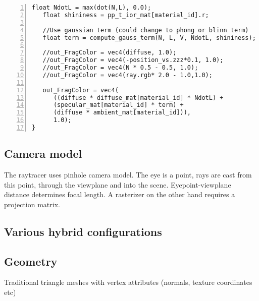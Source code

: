 \begin{Verbatim}[frame=single, numbers=left, label=Final fragment shader]
   float NdotL = max(dot(N,L), 0.0);
   float shininess = pp_t_ior_mat[material_id].r;
	
   //Use gaussian term (could change to phong or blinn term)
   float term = compute_gauss_term(N, L, V, NdotL, shininess);
    
   //out_FragColor = vec4(diffuse, 1.0);
   //out_FragColor = vec4(-position_vs.zzz*0.1, 1.0);
   //out_FragColor = vec4(N * 0.5 - 0.5, 1.0);
   //out_FragColor = vec4(ray.rgb* 2.0 - 1.0,1.0);
    
   out_FragColor = vec4( 
      ((diffuse * diffuse_mat[material_id] * NdotL) + 
      (specular_mat[material_id] * term) + 
      (diffuse * ambient_mat[material_id])), 
      1.0);
}
\end{Verbatim}

\subsection{Camera model}
The raytracer uses pinhole camera model. The eye is a point, rays are cast from this point, through the viewplane and into the scene. Eyepoint-viewplane distance determines focal length. A rasterizer on the other hand requires a projection matrix.

\subsection{Various hybrid configurations}

\subsection{Geometry}
Traditional triangle meshes with vertex attributes (normals, texture coordinates etc)

